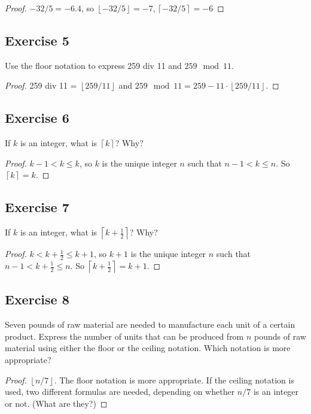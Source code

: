 \documentclass[14pt]{extarticle}
\newcommand{\floor}[1]{{\left\lfloor#1\right\rfloor}}
\newcommand{\ceil}[1]{{\left\lceil#1\right\rceil}}
\begin{document}
\begin{proof}
$-32/5 = -6.4$, so $\floor{-32/5} = -7, \ceil{-32/5} = -6$
\end{proof}

\subsection{Exercise 5}
Use the floor notation to express 259 div 11 and $259 \mod 11$.

\begin{proof}
259 div 11 = $\floor{259/11}$ and $259 \mod 11 = 259 - 11 \cdot \floor{259/11}$.
\end{proof}

\subsection{Exercise 6}
If $k$ is an integer, what is $\ceil{k}$? Why?

\begin{proof}
$k-1 < k \leq k$, so $k$ is the unique integer $n$ such that $n-1 < k \leq n$. So $\ceil{k} = k$.
\end{proof}

\subsection{Exercise 7}
If $k$ is an integer, what is $\ceil{k+\frac{1}{2}}$? Why?

\begin{proof}
$k < k + \frac{1}{2} \leq k+1$, so $k+1$ is the unique integer $n$ such that $n - 1 < k + \frac{1}{2} \leq n$. So $\ceil{k+\frac{1}{2}} = k+1$.
\end{proof}

\subsection{Exercise 8}
Seven pounds of raw material are needed to manufacture each unit of a certain product. Express the number of units that can be produced from $n$ pounds of raw material using either the floor or the ceiling notation. Which notation is more appropriate?

\begin{proof}
$\floor{n/7}$. The floor notation is more appropriate. If the ceiling notation is used, two different formulas are needed, depending on whether $n/7$ is an integer or not. (What are they?)
\end{proof}
\end{document}
